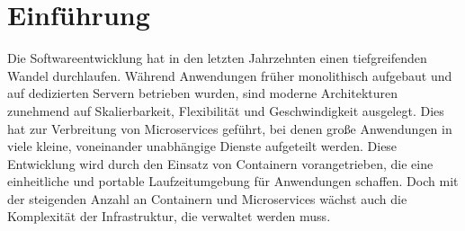 \chapter{Einf\"uhrung}\label{ch:intro}







Die Softwareentwicklung hat in den letzten Jahrzehnten einen tiefgreifenden Wandel durchlaufen. Während Anwendungen früher monolithisch aufgebaut und auf dedizierten Servern betrieben wurden, sind moderne Architekturen zunehmend auf Skalierbarkeit, Flexibilität und Geschwindigkeit ausgelegt. Dies hat zur Verbreitung von Microservices geführt, bei denen große Anwendungen in viele kleine, voneinander unabhängige Dienste aufgeteilt werden. Diese Entwicklung wird durch den Einsatz von Containern vorangetrieben, die eine einheitliche und portable Laufzeitumgebung für Anwendungen schaffen. Doch mit der steigenden Anzahl an Containern und Microservices wächst auch die Komplexität der Infrastruktur, die verwaltet werden muss.

